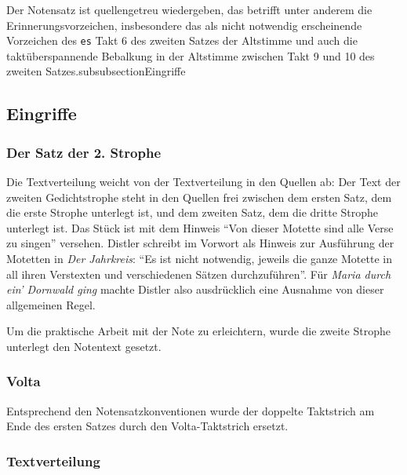 \documentclass{article}
\begin{document}
\begin{multicols}{2}
Der Notensatz ist quellengetreu wiedergeben, das betrifft unter anderem
die Erinnerungsvorzeichen, insbesondere das als nicht notwendig
erscheinende Vorzeichen des \texttt{es} Takt 6 des zweiten Satzes der
Altstimme und auch die taktüberspannende Bebalkung in der Altstimme
zwischen Takt 9 und 10 des zweiten Satzes.subsubsection{Eingriffe}

\subsection{Eingriffe}

\subsubsection{Der Satz der 2. Strophe}

Die Textverteilung weicht von der Textverteilung in den Quellen ab: Der
Text der zweiten Gedichtstrophe steht in den Quellen frei zwischen dem
ersten Satz, dem die erste Strophe unterlegt ist, und dem zweiten Satz,
dem die dritte Strophe unterlegt ist. Das Stück ist mit dem Hinweis
``Von dieser Motette sind alle Verse zu singen'' versehen. Distler
schreibt im Vorwort als Hinweis zur Ausführung der Motetten in \emph{Der
Jahrkreis}: ``Es ist nicht notwendig, jeweils die ganze Motette in all
ihren Verstexten und verschiedenen Sätzen durchzuführen''. Für
\emph{Maria durch ein' Dornwald ging} machte Distler also ausdrücklich
eine Ausnahme von dieser allgemeinen Regel.

Um die praktische Arbeit mit der Note zu erleichtern, wurde die zweite
Strophe unterlegt den Notentext gesetzt.

\subsubsection{Volta}

Entsprechend den Notensatzkonventionen wurde der doppelte Taktstrich am
Ende des ersten Satzes durch den Volta-Taktstrich ersetzt.

\subsubsection{Textverteilung}


\end{multicols}
\end{document}
